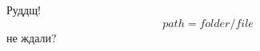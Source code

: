 \documentclass[12pt]{article}
\begin{document}
Руддщ!
\begin{equation}
path=folder/file
\end{equation}
не ждали?
\end{document}
